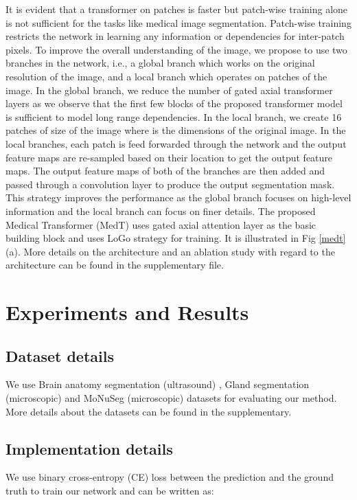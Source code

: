 \documentclass[runningheads]{llncs}
\begin{document}
	It is evident that a transformer on patches is faster but patch-wise training alone is not sufficient for the tasks like medical image segmentation. Patch-wise training restricts the network in learning any information or dependencies for inter-patch pixels. To improve the overall understanding of the image, we propose to use two branches in the network, i.e., a global branch which works on the original resolution of the image, and a local branch which operates on patches of the image.	In the global branch, we reduce the number of gated axial transformer layers as we observe that the first few blocks of the proposed transformer model is sufficient to model long range dependencies. In the local branch, we create 16 patches of size  of the image where  is the dimensions of the original image. In the local branches, each patch is feed forwarded through the network and the output feature maps are re-sampled based on their  location to get the output feature maps. The output feature maps of both of the branches are then added and passed through a  convolution layer to produce the output segmentation mask. This strategy improves the performance as the global branch focuses on high-level information and the local branch can focus on finer details. The proposed Medical Transformer (MedT) uses gated axial attention layer as the basic building block and uses LoGo strategy for training. It is illustrated in Fig \ref{medt} (a). More details on the architecture and an ablation study with regard to the architecture can be found in the supplementary file.
	
	\section{Experiments and Results}
	
	\subsection{Dataset details}
	
	We use Brain anatomy segmentation (ultrasound) \cite{wang2018automatic,valanarasu2020learning}, Gland segmentation (microscopic) \cite{sirinukunwattana2017gland} and MoNuSeg (microscopic) \cite{kumar2019multi,kumar2017dataset} datasets for evaluating our method. More details about the datasets can be found in the supplementary.
	


	\subsection{Implementation details}
	We use binary cross-entropy (CE) loss between the prediction and the ground truth to train our network and can be written as:	
		
\end{document}
